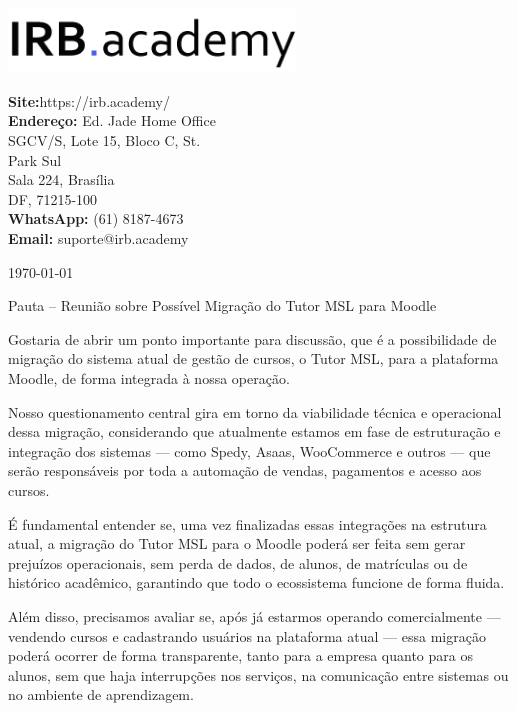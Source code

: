 \documentclass[12pt, a4paper]{letter} %
\begin{document}
\begin{minipage}{0.6\textwidth}
	\includegraphics[width=3in]{IRB.png}
\end{minipage}
\hfill
\begin{minipage}{0.4\textwidth}\raggedright
	\small{\textbf{\color{umdred}Site:}\hphantom{A}https://irb.academy/\\
		\textbf{\color{umdred}Endereço:}\hphantom{A} Ed. Jade Home Office\\
		\hphantom{AA}SGCV/S, Lote 15, Bloco C, St.\\
		\hphantom{AA}Park Sul\\
		\hphantom{AA}Sala 224, Brasília\\
		\hphantom{AA}DF, 71215-100\\
		\textbf{\color{umdred}WhatsApp: }(61) 8187-4673\\
		\textbf{\color{umdred}Email: }suporte@irb.academy }
\end{minipage}

\today

\maketitle
Pauta – Reunião sobre Possível Migração do Tutor MSL para Moodle

Gostaria de abrir um ponto importante para discussão, que é a possibilidade de migração do sistema atual de gestão de cursos, o Tutor MSL, para a plataforma Moodle, de forma integrada à nossa operação.

Nosso questionamento central gira em torno da viabilidade técnica e operacional dessa migração, considerando que atualmente estamos em fase de estruturação e integração dos sistemas — como Spedy, Asaas, WooCommerce e outros — que serão responsáveis por toda a automação de vendas, pagamentos e acesso aos cursos.

É fundamental entender se, uma vez finalizadas essas integrações na estrutura atual, a migração do Tutor MSL para o Moodle poderá ser feita sem gerar prejuízos operacionais, sem perda de dados, de alunos, de matrículas ou de histórico acadêmico, garantindo que todo o ecossistema funcione de forma fluida.

Além disso, precisamos avaliar se, após já estarmos operando comercialmente — vendendo cursos e cadastrando usuários na plataforma atual — essa migração poderá ocorrer de forma transparente, tanto para a empresa quanto para os alunos, sem que haja interrupções nos serviços, na comunicação entre sistemas ou no ambiente de aprendizagem.
\end{document}
